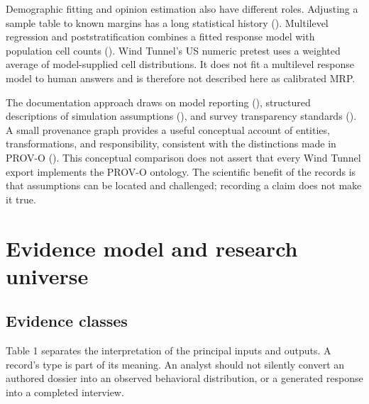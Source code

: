 \documentclass[
  11pt,
]{article}
\let\originalsection\section
\renewcommand{\section}{\Needspace{5\baselineskip}\originalsection}
\begin{document}
Demographic fitting and opinion estimation also have different roles.
Adjusting a sample table to known margins has a long statistical history
(). Multilevel
regression and poststratification combines a fitted response model with
population cell counts (). Wind Tunnel's US numeric pretest uses a weighted average of
model-supplied cell distributions. It does not fit a multilevel response
model to human answers and is therefore not described here as calibrated
MRP.

The documentation approach draws on model reporting
(), structured
descriptions of simulation assumptions (), and survey transparency standards
(). A small provenance graph provides a useful conceptual account of
entities, transformations, and responsibility, consistent with the
distinctions made in PROV-O (). This conceptual comparison does not assert that every
Wind Tunnel export implements the PROV-O ontology. The scientific
benefit of the records is that assumptions can be located and
challenged; recording a claim does not make it true.

\section{Evidence model and research
universe}\label{evidence-model-and-research-universe}

\subsection{Evidence classes}\label{evidence-classes}

Table 1 separates the interpretation of the principal inputs and
outputs. A record's type is part of its meaning. An analyst should not
silently convert an authored dossier into an observed behavioral
distribution, or a generated response into a completed interview.
\end{document}

